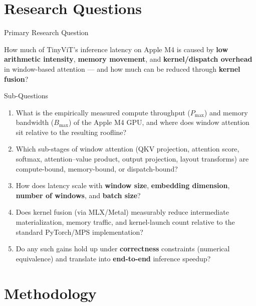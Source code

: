 \documentclass[aspectratio=169]{beamer}
\begin{document}
\section{Research Questions}

\begin{frame}{Primary Research Question}
  \begin{block}{}
    \centering
    \Large
    How much of TinyViT's inference latency on Apple M4 is caused by \textbf{low arithmetic
    intensity}, \textbf{memory movement}, and \textbf{kernel/dispatch overhead} in window-based
    attention --- and how much can be reduced through \textbf{kernel fusion}?
  \end{block}
\end{frame}

\begin{frame}{Sub-Questions}
  \begin{enumerate}
    \item What is the empirically measured compute throughput ($P_{\max}$) and memory bandwidth
      ($B_{\max}$) of the Apple M4 GPU, and where does window attention sit relative to the
      resulting roofline?
    \item Which sub-stages of window attention (QKV projection, attention score, softmax,
      attention--value product, output projection, layout transforms) are compute-bound,
      memory-bound, or dispatch-bound?
    \item How does latency scale with \textbf{window size}, \textbf{embedding dimension},
      \textbf{number of windows}, and \textbf{batch size}?
    \item Does kernel fusion (via MLX/Metal) measurably reduce intermediate materialization,
      memory traffic, and kernel-launch count relative to the standard PyTorch/MPS
      implementation?
    \item Do any such gains hold up under \textbf{correctness} constraints (numerical
      equivalence) and translate into \textbf{end-to-end} inference speedup?
  \end{enumerate}
\end{frame}

\section{Methodology}
\end{document}
